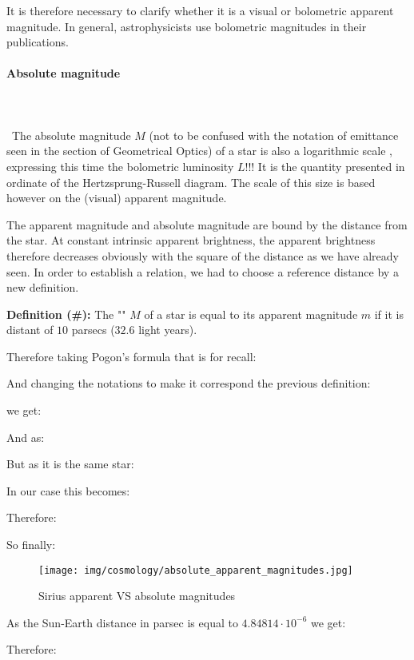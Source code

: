 	It is therefore necessary to clarify whether it is a  visual or bolometric apparent magnitude. In general, astrophysicists use bolometric magnitudes in their publications.
	
	\paragraph{Absolute magnitude}\mbox{}\\\\\
	The absolute magnitude $M$ (not to be confused with the notation of emittance seen in the section of Geometrical Optics) of a star is also a logarithmic scale , expressing this time the bolometric luminosity $L$!!! It is the quantity presented in ordinate of the Hertzsprung-Russell diagram. The scale of this size is based however on the (visual) apparent magnitude.

	The apparent magnitude and absolute magnitude are bound by the distance from the star. At constant intrinsic apparent brightness, the apparent brightness therefore decreases obviously with the square of the distance as we have already seen. In order to establish a relation, we had to choose a reference distance by a new definition.

	\textbf{Definition (\#\mydef):} The "" $M$ of a star is equal to its apparent magnitude $m$ if it is distant of $10$ parsecs ($32.6$ light years).
	
	Therefore taking Pogon's formula that is for recall:
	
	And changing the notations to make it correspond the previous definition:
	
	we get:
	
	And as:
	
	But as it is the same star:
	
	In our case this becomes:
	
	Therefore:
	
	So finally:
	
	\begin{figure}[H]
		\begin{center}
		\texttt{[image: img/cosmology/absolute\_apparent\_magnitudes.jpg]}
		\end{center}	
		\caption{Sirius apparent VS absolute magnitudes}
	\end{figure}
	As the Sun-Earth distance in parsec is equal to $4.84814\cdot 10^{-6}$  we get:
	
	Therefore:
	
